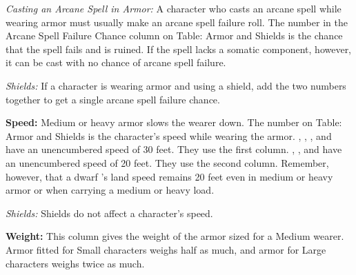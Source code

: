 \textit{Casting an Arcane Spell in Armor:} A character who casts an arcane spell 
while wearing armor must usually make an arcane spell failure roll. The number 
in the Arcane Spell Failure Chance column on Table: Armor and Shields is the chance 
that the spell fails and is ruined. If the spell lacks a somatic component, however, 
it can be cast with no chance of arcane spell failure.

\textit{Shields:} If a character is wearing armor and using a shield, add the two 
numbers together to get a single arcane spell failure chance.

\textbf{Speed:} Medium or heavy armor slows the wearer down. The number on Table: 
Armor and Shields is the character's speed while wearing the armor. , , 
, and  have an unencumbered speed of 30 feet.
They use the first column. , , and  have an unencumbered 
speed of 20 feet. They use the second column. Remember, however, that a dwarf 's 
land speed remains 20 feet even in medium or heavy armor or when carrying a medium 
or heavy load.

\textit{Shields:} Shields do not affect a character's speed.

\textbf{Weight:} This column gives the weight of the armor sized for a Medium wearer. 
Armor fitted for Small characters weighs half as much, and armor for Large characters 
weighs twice as much.


